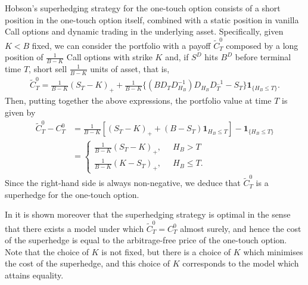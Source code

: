 \documentclass[a4paper]{amsart}
\theoremstyle{definition}
\theoremstyle{remark}
\numberwithin{equation}{section}
\newcommand{\ind}{\boldsymbol{1}}
\begin{document}
Hobson's superhedging strategy for the one-touch option consists of a short position in the one-touch option itself, combined with a static position in vanilla Call options and dynamic trading in the underlying asset. Specifically, given  $K<B$ fixed, we can consider the portfolio with a payoff $\tilde{C}^0_T$ composed by a long position of  $\frac{1}{B-K}$ Call options with strike $K$  and, if $S^D$ hits $B^D$ before terminal time $T$, short sell $\frac{1}{B-K}$ units of asset, that is, 
\begin{align*}
\tilde{C}^0_T=\frac{1}{B-K}(S_T-K)_+ +\frac{1}{B-K}\{(BD_TD^{-1}_{H_B})D_{H_B}D_T^{_-1}-S_T\}\ind_{\{H_{B}\leq T\}}.
\end{align*}
Then, putting together the above expressions, the portfolio value at time $T$ is given by
\begin{align*}
\tilde{C}^0_T-C^0_T&=\frac{1}{B-K}[(S_T-K)_+ +(B-S_T)\ind_{H_B\leq T}]-\ind_{\{H_B\leq T\}}\\
&=
\begin{cases}
\frac{1}{B-K}(S_T-K)_+,\;\;&H_B>T\\
\frac{1}{B-K}(K-S_T)_+,\;\;&H_B\leq T.
\end{cases}
\end{align*}
Since the right-hand side is always non-negative, we deduce that $\tilde{C}^0_T$ is a superhedge for the one-touch option.
 
In \cite{Hobson:1998aa} it is shown moreover that the superhedging strategy is optimal in the sense that there exists a model under which $\tilde{C}^0_T = C^0_T$ almost surely, and hence the cost of the superhedge is equal to the arbitrage-free price of the one-touch option. Note that the choice of $K$ is not fixed, but there is a choice of $K$ which minimises the cost of the superhedge, and this choice of $K$ corresponds to the model which attains equality.
\end{document}
